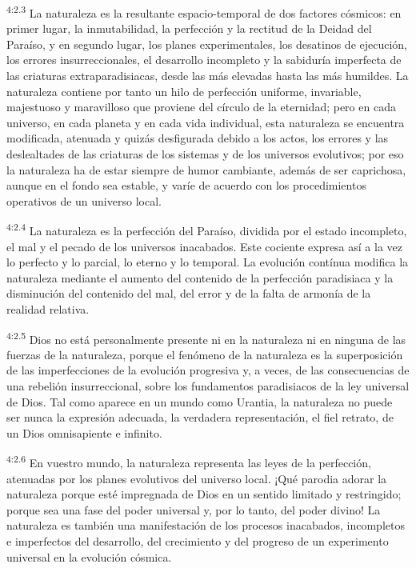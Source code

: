 \par
\textsuperscript{4:2.3} La naturaleza es la resultante espacio-temporal de dos factores cósmicos: en primer lugar, la inmutabilidad, la perfección y la rectitud de la Deidad del Paraíso, y en segundo lugar, los planes experimentales, los desatinos de ejecución, los errores insurreccionales, el desarrollo incompleto y la sabiduría imperfecta de las criaturas extraparadisiacas, desde las más elevadas hasta las más humildes. La naturaleza contiene por tanto un hilo de perfección uniforme, invariable, majestuoso y maravilloso que proviene del círculo de la eternidad; pero en cada universo, en cada planeta y en cada vida individual, esta naturaleza se encuentra modificada, atenuada y quizás desfigurada debido a los actos, los errores y las deslealtades de las criaturas de los sistemas y de los universos evolutivos; por eso la naturaleza ha de estar siempre de humor cambiante, además de ser caprichosa, aunque en el fondo sea estable, y varíe de acuerdo con los procedimientos operativos de un universo local.

\par
\textsuperscript{4:2.4} La naturaleza es la perfección del Paraíso, dividida por el estado incompleto, el mal y el pecado de los universos inacabados. Este cociente expresa así a la vez lo perfecto y lo parcial, lo eterno y lo temporal. La evolución contínua modifica la naturaleza mediante el aumento del contenido de la perfección paradisiaca y la disminución del contenido del mal, del error y de la falta de armonía de la realidad relativa.

\par
\textsuperscript{4:2.5} Dios no está personalmente presente ni en la naturaleza ni en ninguna de las fuerzas de la naturaleza, porque el fenómeno de la naturaleza es la superposición de las imperfecciones de la evolución progresiva y, a veces, de las consecuencias de una rebelión insurreccional, sobre los fundamentos paradisiacos de la ley universal de Dios. Tal como aparece en un mundo como Urantia, la naturaleza no puede ser nunca la expresión adecuada, la verdadera representación, el fiel retrato, de un Dios omnisapiente e infinito.

\par
\textsuperscript{4:2.6} En vuestro mundo, la naturaleza representa las leyes de la perfección, atenuadas por los planes evolutivos del universo local. ¡Qué parodia adorar la naturaleza porque esté impregnada de Dios en un sentido limitado y restringido; porque sea una fase del poder universal y, por lo tanto, del poder divino! La naturaleza es también una manifestación de los procesos inacabados, incompletos e imperfectos del desarrollo, del crecimiento y del progreso de un experimento universal en la evolución cósmica.

